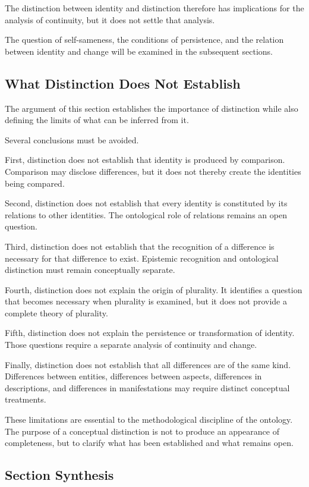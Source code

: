 The distinction between identity and distinction
therefore has implications for the analysis
of continuity, but it does not settle that
analysis.

The question of self-sameness, the conditions
of persistence, and the relation between identity
and change will be examined in the subsequent
sections.

\subsection{What Distinction Does Not Establish}

The argument of this section establishes the
importance of distinction while also defining
the limits of what can be inferred from it.

Several conclusions must be avoided.

First, distinction does not establish that
identity is produced by comparison. Comparison
may disclose differences, but it does not
thereby create the identities being compared.

Second, distinction does not establish that
every identity is constituted by its relations
to other identities. The ontological role
of relations remains an open question.

Third, distinction does not establish that
the recognition of a difference is necessary
for that difference to exist. Epistemic
recognition and ontological distinction
must remain conceptually separate.

Fourth, distinction does not explain the
origin of plurality. It identifies a question
that becomes necessary when plurality is
examined, but it does not provide a complete
theory of plurality.

Fifth, distinction does not explain the
persistence or transformation of identity.
Those questions require a separate analysis
of continuity and change.

Finally, distinction does not establish
that all differences are of the same kind.
Differences between entities, differences
between aspects, differences in descriptions,
and differences in manifestations may
require distinct conceptual treatments.

These limitations are essential to the
methodological discipline of the ontology.
The purpose of a conceptual distinction
is not to produce an appearance of
completeness, but to clarify what has
been established and what remains open.

\subsection{Section Synthesis}

